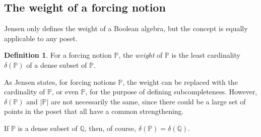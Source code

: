 \documentclass{amsart}
\theoremstyle{definition}
\newtheorem{definition}[theorem]{Definition}
\theoremstyle{remark}
\renewcommand{\P}{\mathbb{P}}
\newcommand{\Q}{\mathbb{Q}}
\begin{document}
\subsection{The weight of a forcing notion}
\label{subsec:delta}
Jensen only defines the weight of a Boolean algebra, but the concept is equally applicable to any poset.

\begin{definition} For a forcing notion $\P$, the \emph{weight} of \(\P\) is the least cardinality $\delta(\P)$ of a dense subset of $\P$. 
\end{definition}

As Jensen states, for forcing notions $\P$, the weight can be replaced with the cardinality of $\P$, or even $\P$, for the purpose of defining subcompleteness. However, $\delta(\P)$ and $|\P|$ are not necessarily the same, since there could be a large set of points in the poset that all have a common strengthening. 

If $\P$ is a dense subset of $\Q$, then, of course, $\delta(\P) = \delta(\Q)$.
\end{document}
